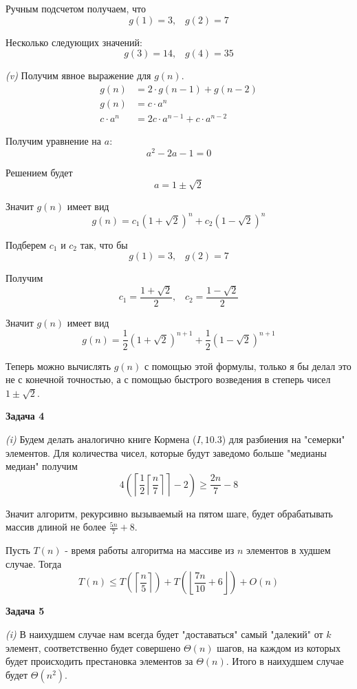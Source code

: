 \documentclass[10pt]{article}
\begin{document}
Ручным подсчетом получаем, что
$$
  g(1) = 3, \;\;\; g(2) = 7
$$

Несколько следующих значений:
$$
  g(3) = 14, \;\;\; g(4) = 35
$$

\smallskip

{\it (v)}
Получим явное выражение для $g(n)$.
\begin{align*}
  g(n) &= 2 \cdot g(n - 1) + g(n - 2)\\
  g(n) &= c \cdot a^n\\
  c \cdot a^n &= 2 c \cdot a^{n - 1} + c \cdot a^{n - 2}
\end{align*}

Получим уравнение на $a$:
$$
  a^2 - 2 a - 1 = 0
$$

Решением будет
$$
  a = 1 \pm \sqrt{2}
$$

Значит $g(n)$ имеет вид
$$
  g(n) = c_1 (1 + \sqrt{2})^n + c_2 (1 - \sqrt{2})^n
$$

Подберем $c_1$ и $c_2$ так, что бы
$$
  g(1) = 3, \;\;\; g(2) = 7
$$

Получим
$$
  c_1 = \frac{1 + \sqrt{2}}{2}, \;\;\; c_2 = \frac{1 - \sqrt{2}}{2}
$$

Значит $g(n)$ имеет вид
$$
  g(n) = \frac{1}{2} (1 + \sqrt{2})^{n + 1} + \frac{1}{2} (1 - \sqrt{2})^{n + 1}
$$

Теперь можно вычислять $g(n)$ с помощью этой формулы, только я бы делал это не с конечной точностью, а с помощью быстрого возведения в степерь чисел $1 \pm \sqrt{2}$.

\medskip

{\bf Задача 4}

{\it (i)}
Будем делать аналогично книге Кормена ($I, 10.3$) для разбиения на "семерки" элементов.
Для количества чисел, которые будут заведомо больше "медианы медиан" получим
$$
  4 \left( \left\lceil \frac{1}{2} \left\lceil \frac{n}{7} \right\rceil \right\rceil - 2 \right) \geq \frac{2n}{7} - 8
$$

Значит алгоритм, рекурсивно вызываемый на пятом шаге, будет обрабатывать массив длиной не более $\frac{5n}{7} + 8$.

Пусть $T(n)$ - время работы алгоритма на массиве из $n$ элементов в худшем случае.
Тогда
$$
  T(n) \leq T \left( \left\lceil \frac{n}{5} \right\rceil \right) + T \left( \left\lfloor \frac{7n}{10} + 6 \right\rfloor \right) + O(n)
$$

\medskip

{\bf Задача 5}

{\it (i)}
В наихудшем случае нам всегда будет "доставаться" самый "далекий" от $k$ элемент, соответственно будет совершено $\Theta(n)$ шагов, на каждом из которых будет происходить престановка элементов за $\Theta(n)$. Итого в наихудшем случае будет $\Theta(n^2)$.
\end{document}
